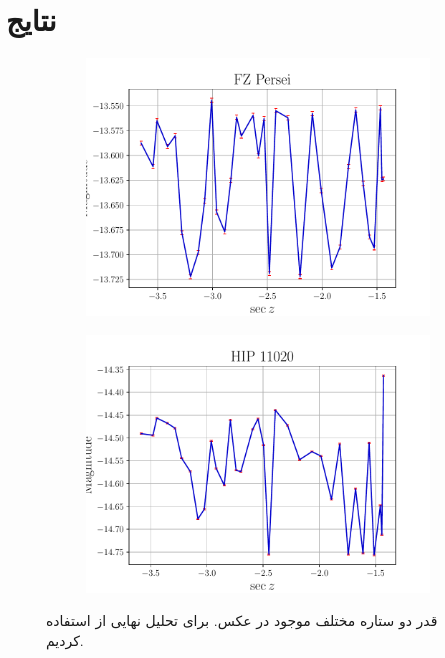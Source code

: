 \documentclass[12pt,a4paper]{article}
\begin{document}
	\section{نتایج}
	\begin{figure}
		\centering
		\begin{subfigure}{0.49\linewidth}
			\centering
			\includegraphics[width=\linewidth]{../fig/persei}
		\end{subfigure}
		\begin{subfigure}{0.49\linewidth}
			\centering
			\includegraphics[width=\linewidth]{../fig/hip}
		\end{subfigure}
		\caption{قدر دو ستاره مختلف موجود در عکس. برای تحلیل نهایی از  استفاده کردیم.}
		\label{fig:raw}
	\end{figure}
\end{document}
